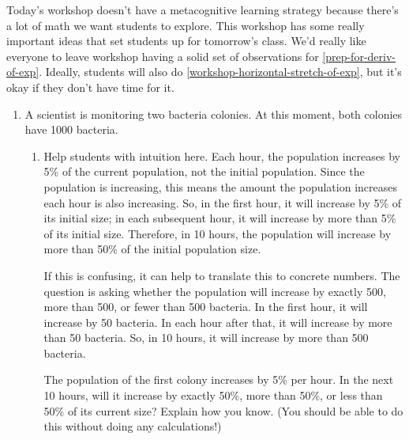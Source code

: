 \documentclass{article}
\begin{document}

\begin{workshop}
  Today's workshop doesn't have a metacognitive learning strategy because there's a lot of math we want students to explore. This workshop has some really important ideas that set students up for tomorrow's class. We'd really like everyone to leave workshop having a solid set of observations for \ref{prep-for-deriv-of-exp}. Ideally, students will also do \ref{workshop-horizontal-stretch-of-exp}, but it's okay if they don't have time for it.
\end{workshop}

\begin{enumerate}
\item  \label{workshop-exponential-vs-linear}

  A scientist is monitoring two bacteria colonies. At this moment, both colonies have 1000 bacteria.

  \begin{enumerate}
  \item

    \begin{workshop}
      Help students with intuition here. Each hour, the population increases by 5\% of the current population, not the initial population. Since the population is increasing, this means the amount the population increases each hour is also increasing. So, in the first hour, it will increase by 5\% of its initial size; in each subsequent hour, it will increase by more than 5\% of its initial size. Therefore, in 10 hours, the population will increase by more than 50\% of the initial population size.

      If this is confusing, it can help to translate this to concrete numbers. The question is asking whether the population will increase by exactly 500, more than 500, or fewer than 500 bacteria. In the first hour, it will increase by 50 bacteria. In each hour after that, it will increase by more than 50 bacteria. So, in 10 hours, it will increase by more than 500 bacteria. 
    \end{workshop}

    \begin{problem}[\vfill]
      The population of the first colony increases by 5\% per hour. In the next 10 hours, will it increase by exactly 50\%, more than 50\%, or less than 50\% of its current size? Explain how you know. (You should be able to do this without doing any calculations!) 
    \end{problem}


\end{enumerate}
\end{enumerate}
\end{document}
